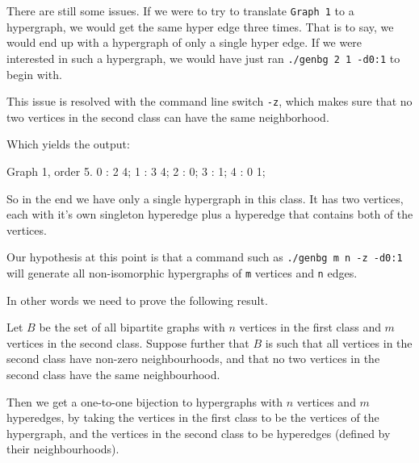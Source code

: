 There are still some issues. If we were to try to translate \texttt{Graph 1} to a hypergraph, we would get the same hyper edge three times. That is to say, we would end up with a hypergraph of only a single hyper edge. If we were interested in such a hypergraph, we would have just ran \texttt{./genbg 2 1 -d0:1} to begin with.

This issue is resolved with the command line switch \texttt{-z}, which makes sure that no two vertices in the second class can have the same neighborhood.

Which yields the output:

\begin{output}
Graph 1, order 5.
  0 : 2 4;
  1 : 3 4;
  2 : 0;
  3 : 1;
  4 : 0 1;

\end{output}
So in the end we have only a single hypergraph in this class. It has two vertices, each with it's own singleton hyperedge plus a hyperedge that contains both of the vertices.

Our hypothesis at this point is that a command such as \texttt{./genbg m n -z -d0:1} will generate all non-isomorphic hypergraphs of \texttt{m} vertices and \texttt{n} edges.

In other words we need to prove the following result.

\begin{theorem}

Let $B$ be the set of all bipartite graphs with $n$ vertices in the first class and $m$ vertices in the second class.
Suppose further that $B$ is such that all vertices in the second class have non-zero neighbourhoods, and that no two vertices in the second class have the same neighbourhood.

Then we get a one-to-one bijection to hypergraphs with $n$ vertices and $m$ hyperedges, by taking the vertices in the first class to be the vertices of the hypergraph, and the vertices in the second class to be hyperedges (defined by their neighbourhoods).

\end{theorem}
